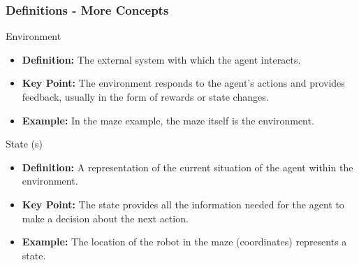 \documentclass[aspectratio=169]{beamer}
\begin{document}
\begin{frame}[fragile]
    \frametitle{Definitions - More Concepts}
    \begin{block}{Environment}
        \begin{itemize}
            \item \textbf{Definition:} The external system with which the agent interacts.
            \item \textbf{Key Point:} The environment responds to the agent's actions and provides feedback, usually in the form of rewards or state changes.
            \item \textbf{Example:} In the maze example, the maze itself is the environment.
        \end{itemize}
    \end{block}
    
    \begin{block}{State (s)}
        \begin{itemize}
            \item \textbf{Definition:} A representation of the current situation of the agent within the environment.
            \item \textbf{Key Point:} The state provides all the information needed for the agent to make a decision about the next action.
            \item \textbf{Example:} The location of the robot in the maze (coordinates) represents a state.
        \end{itemize}
    \end{block}
\end{frame}
\end{document}
